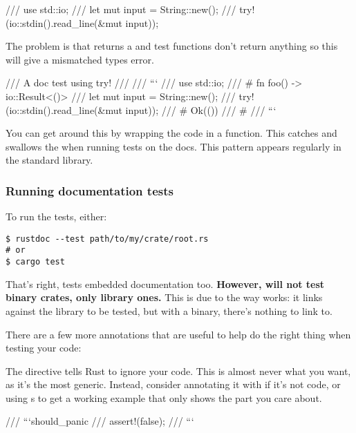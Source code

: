 \begin{rustc}
/// use std::io;
/// let mut input = String::new();
/// try!(io::stdin().read_line(&mut input));
\end{rustc}

The problem is that  returns a  and test functions don't return anything so this will give a 
mismatched types error.

\begin{rustc}
/// A doc test using try!
///
/// ```
/// use std::io;
/// # fn foo() -> io::Result<()> {
/// let mut input = String::new();
/// try!(io::stdin().read_line(&mut input));
/// # Ok(())
/// # }
/// ```
\end{rustc}

You can get around this by wrapping the code in a function. This catches and swallows the  when running tests on 
the docs. This pattern appears regularly in the standard library.

\subsubsection*{Running documentation tests}

To run the tests, either:

\begin{verbatim}
$ rustdoc --test path/to/my/crate/root.rs
# or
$ cargo test
\end{verbatim}

That's right,  tests embedded documentation too. \textbf{However,  will not test binary crates, 
only library ones.} This is due to the way  works: it links against the library to be tested, but with a binary, 
there’s nothing to link to.

\blank

There are a few more annotations that are useful to help  do the right thing when testing your code:

\begin{rustc}
/// ```ignore
/// fn foo() {
/// ```
\end{rustc}

The  directive tells Rust to ignore your code. This is almost never what you want, as it's the most generic. Instead, 
consider annotating it with  if it's not code, or using \code{\#}s to get a working example that only shows the part 
you care about.

\begin{rustc}
/// ```should_panic
/// assert!(false);
/// ```
\end{rustc}

